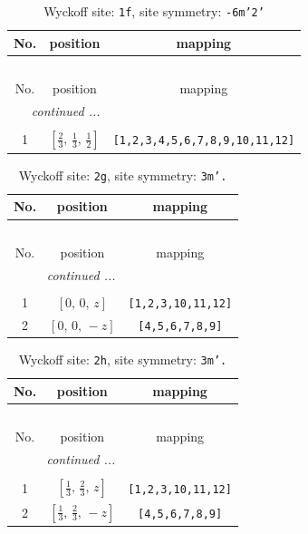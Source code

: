 \documentclass[fleqn,8pt]{jsarticle}
\begin{document}
\renewcommand{\arraystretch}{1.2}
\begin{longtable}{ccc}
\caption{Wyckoff site: {\tt 1f}, site symmetry: {\tt -6m'2'}}
 \\
 \hline \hline
No. & position & mapping \\ \hline \endfirsthead

\multicolumn{2}{l}{\tablename\ \thetable{}} \\
 \hline \hline
No. & position & mapping \\ \hline \endhead

 \hline \hline
\multicolumn{2}{r}{\footnotesize\it continued ...} \\ \endfoot

 \hline \hline
\multicolumn{2}{r}{} \\ \endlastfoot

1 & $\left[ \frac{2}{3},\, \frac{1}{3},\, \frac{1}{2} \right]$ & {\tt [1,2,3,4,5,6,7,8,9,10,11,12]} \\
\end{longtable}
\renewcommand{\arraystretch}{1.2}
\begin{longtable}{ccc}
\caption{Wyckoff site: {\tt 2g}, site symmetry: {\tt 3m'.}}
 \\
 \hline \hline
No. & position & mapping \\ \hline \endfirsthead

\multicolumn{2}{l}{\tablename\ \thetable{}} \\
 \hline \hline
No. & position & mapping \\ \hline \endhead

 \hline \hline
\multicolumn{2}{r}{\footnotesize\it continued ...} \\ \endfoot

 \hline \hline
\multicolumn{2}{r}{} \\ \endlastfoot

1 & $\left[ 0,\, 0,\, z \right]$ & {\tt [1,2,3,10,11,12]} \\ \hline
2 & $\left[ 0,\, 0,\, - z \right]$ & {\tt [4,5,6,7,8,9]} \\
\end{longtable}
\renewcommand{\arraystretch}{1.2}
\begin{longtable}{ccc}
\caption{Wyckoff site: {\tt 2h}, site symmetry: {\tt 3m'.}}
 \\
 \hline \hline
No. & position & mapping \\ \hline \endfirsthead

\multicolumn{2}{l}{\tablename\ \thetable{}} \\
 \hline \hline
No. & position & mapping \\ \hline \endhead

 \hline \hline
\multicolumn{2}{r}{\footnotesize\it continued ...} \\ \endfoot

 \hline \hline
\multicolumn{2}{r}{} \\ \endlastfoot

1 & $\left[ \frac{1}{3},\, \frac{2}{3},\, z \right]$ & {\tt [1,2,3,10,11,12]} \\ \hline
2 & $\left[ \frac{1}{3},\, \frac{2}{3},\, - z \right]$ & {\tt [4,5,6,7,8,9]} \\
\end{longtable}
\end{document}
